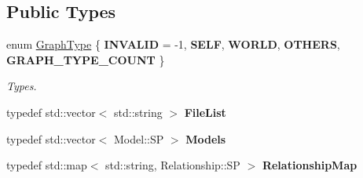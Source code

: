 \subsection*{Public Types}
\begin{DoxyCompactItemize}
\item 
\mbox{\label{class_model_agent_a0e4db842aaa669acc5da6c17fae0a2de}} 
enum \hyperlink{class_model_agent_a0e4db842aaa669acc5da6c17fae0a2de}{Graph\+Type} \{ \newline
{\bfseries I\+N\+V\+A\+L\+ID} = -\/1, 
{\bfseries S\+E\+LF}, 
{\bfseries W\+O\+R\+LD}, 
{\bfseries O\+T\+H\+E\+RS}, 
\newline
{\bfseries G\+R\+A\+P\+H\+\_\+\+T\+Y\+P\+E\+\_\+\+C\+O\+U\+NT}
 \}\begin{DoxyCompactList}\small\item\em Types. \end{DoxyCompactList}
\item 
\mbox{\label{class_model_agent_a56f1c63cf032ea60ffc98e840bdfb105}} 
typedef std\+::vector$<$ std\+::string $>$ {\bfseries File\+List}
\item 
\mbox{\label{class_model_agent_aca3ac086dcb6a357227634aafb830076}} 
typedef std\+::vector$<$ Model\+::\+SP $>$ {\bfseries Models}
\item 
\mbox{\label{class_model_agent_a7f4b350e7059f7f09b56e05b7cb54d54}} 
typedef std\+::map$<$ std\+::string, Relationship\+::\+SP $>$ {\bfseries Relationship\+Map}
\end{DoxyCompactItemize}
